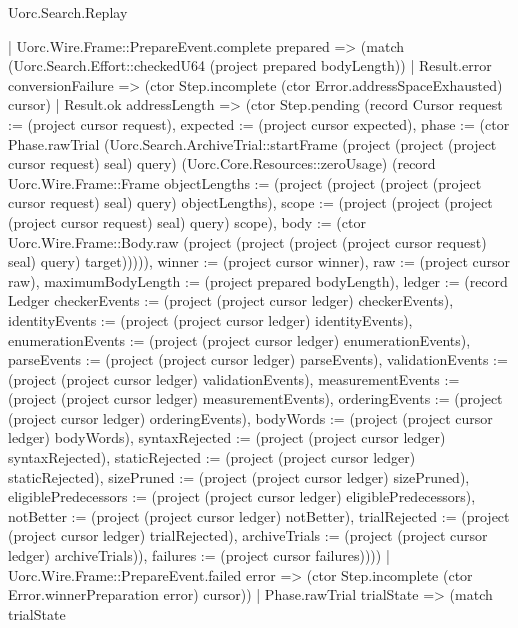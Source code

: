 \begin{lexlean}{Uorc.Search.Replay}
\begin{semanticmodule}
{      | Uorc.Wire.Frame::PrepareEvent.complete prepared => (match (Uorc.Search.Effort::checkedU64 (project prepared bodyLength))
        | Result.error conversionFailure => (ctor Step.incomplete (ctor Error.addressSpaceExhausted) cursor)
        | Result.ok addressLength => (ctor Step.pending (record Cursor {request := (project cursor request), expected := (project cursor expected), phase := (ctor Phase.rawTrial (Uorc.Search.ArchiveTrial::startFrame (project (project (project cursor request) seal) query) (Uorc.Core.Resources::zeroUsage) (record Uorc.Wire.Frame::Frame {objectLengths := (project (project (project (project cursor request) seal) query) objectLengths), scope := (project (project (project (project cursor request) seal) query) scope), body := (ctor Uorc.Wire.Frame::Body.raw (project (project (project (project cursor request) seal) query) target))}))), winner := (project cursor winner), raw := (project cursor raw), maximumBodyLength := (project prepared bodyLength), ledger := (record Ledger {checkerEvents := (project (project cursor ledger) checkerEvents), identityEvents := (project (project cursor ledger) identityEvents), enumerationEvents := (project (project cursor ledger) enumerationEvents), parseEvents := (project (project cursor ledger) parseEvents), validationEvents := (project (project cursor ledger) validationEvents), measurementEvents := (project (project cursor ledger) measurementEvents), orderingEvents := (project (project cursor ledger) orderingEvents), bodyWords := (project (project cursor ledger) bodyWords), syntaxRejected := (project (project cursor ledger) syntaxRejected), staticRejected := (project (project cursor ledger) staticRejected), sizePruned := (project (project cursor ledger) sizePruned), eligiblePredecessors := (project (project cursor ledger) eligiblePredecessors), notBetter := (project (project cursor ledger) notBetter), trialRejected := (project (project cursor ledger) trialRejected), archiveTrials := (project (project cursor ledger) archiveTrials)}), failures := (project cursor failures)})))
      | Uorc.Wire.Frame::PrepareEvent.failed error => (ctor Step.incomplete (ctor Error.winnerPreparation error) cursor))
    | Phase.rawTrial trialState => (match trialState
}
\end{semanticmodule}
\end{lexlean}
